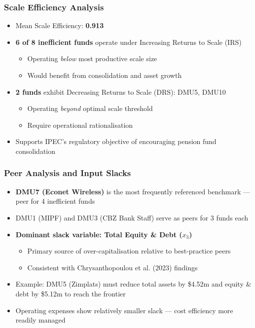 \documentclass{beamer}
\begin{document}
\begin{frame}
    \frametitle{Scale Efficiency Analysis}
    \begin{itemize}
        \item Mean Scale Efficiency: \textbf{0.913}
        \item \textbf{6 of 8 inefficient funds} operate under Increasing Returns to Scale (IRS)
        \begin{itemize}
            \item Operating \textit{below} most productive scale size
            \item Would benefit from consolidation and asset growth
        \end{itemize}
        \item \textbf{2 funds} exhibit Decreasing Returns to Scale (DRS): DMU5, DMU10
        \begin{itemize}
            \item Operating \textit{beyond} optimal scale threshold
            \item Require operational rationalisation
        \end{itemize}
        \item Supports IPEC's regulatory objective of encouraging pension fund consolidation
    \end{itemize}
\end{frame}

\begin{frame}
    \frametitle{Peer Analysis and Input Slacks}
    \begin{itemize}
        \item \textbf{DMU7 (Econet Wireless)} is the most frequently referenced benchmark --- peer for 4 inefficient funds
        \item DMU1 (MIPF) and DMU3 (CBZ Bank Staff) serve as peers for 3 funds each
        \item \textbf{Dominant slack variable: Total Equity \& Debt ($x_3$)}
        \begin{itemize}
            \item Primary source of over-capitalisation relative to best-practice peers
            \item Consistent with Chrysanthopoulou et al. (2023) findings
        \end{itemize}
        \item Example: DMU5 (Zimplats) must reduce total assets by \$4.52m and equity \& debt by \$5.12m to reach the frontier
        \item Operating expenses show relatively smaller slack --- cost efficiency more readily managed
    \end{itemize}
\end{frame}
\end{document}
